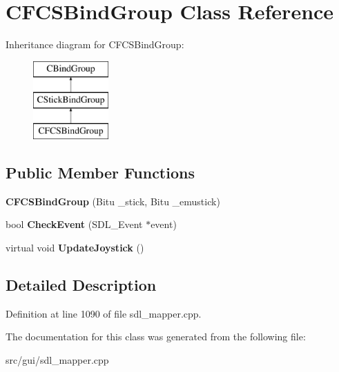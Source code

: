 \hypertarget{classCFCSBindGroup}{\section{C\-F\-C\-S\-Bind\-Group Class Reference}
\label{classCFCSBindGroup}
}
Inheritance diagram for C\-F\-C\-S\-Bind\-Group\-:\begin{figure}[H]
\begin{center}
\leavevmode
\includegraphics[height=3.000000cm]{classCFCSBindGroup}
\end{center}
\end{figure}
\subsection*{Public Member Functions}
\begin{DoxyCompactItemize}
\item 
\hypertarget{classCFCSBindGroup_a366a39efa7db658cfdec657580818264}{{\bfseries C\-F\-C\-S\-Bind\-Group} (Bitu \-\_\-stick, Bitu \-\_\-emustick)}\label{classCFCSBindGroup_a366a39efa7db658cfdec657580818264}

\item 
\hypertarget{classCFCSBindGroup_a25a662090cb26b626cac51449c94e3af}{bool {\bfseries Check\-Event} (S\-D\-L\-\_\-\-Event $\ast$event)}\label{classCFCSBindGroup_a25a662090cb26b626cac51449c94e3af}

\item 
\hypertarget{classCFCSBindGroup_a19be69d6c38cc544b2b4517eeab84fef}{virtual void {\bfseries Update\-Joystick} ()}\label{classCFCSBindGroup_a19be69d6c38cc544b2b4517eeab84fef}

\end{DoxyCompactItemize}


\subsection{Detailed Description}


Definition at line 1090 of file sdl\-\_\-mapper.\-cpp.



The documentation for this class was generated from the following file\-:\begin{DoxyCompactItemize}
\item 
src/gui/sdl\-\_\-mapper.\-cpp\end{DoxyCompactItemize}
